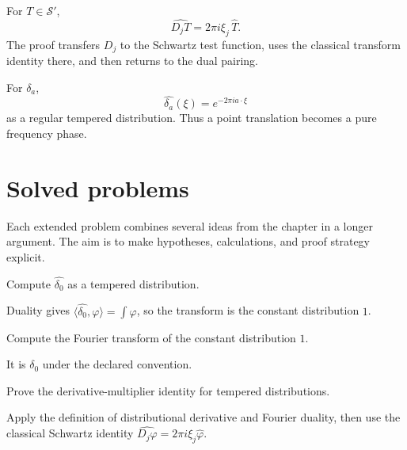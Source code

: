 \begin{example}\label{ex:iii19-worked-03}
For \(T\in\mathcal S'\),
\[
\widehat{D_jT}=2\pi i\xi_j\,\widehat T.
\]
The proof transfers \(D_j\) to the Schwartz test function, uses the classical
transform identity there, and then returns to the dual pairing.
\end{example}

\begin{example}\label{ex:iii19-worked-04}
For \(\delta_a\),
\[
\widehat{\delta_a}(\xi)=e^{-2\pi ia\cdot\xi}
\]
as a regular tempered distribution. Thus a point translation becomes a pure
frequency phase.
\end{example}

\section{Solved problems}
Each extended problem combines several ideas from the chapter in a longer argument. The aim is to make hypotheses, calculations, and proof strategy explicit.

\begin{problem}\label{prob:iii19-problem-01}
Compute \(\widehat{\delta_0}\) as a tempered distribution.
\end{problem}
\begin{solution}
Duality gives
\(\langle\widehat{\delta_0},\varphi\rangle=\int\varphi\), so the transform is
the constant distribution \(1\).
\end{solution}

\begin{problem}\label{prob:iii19-problem-02}
Compute the Fourier transform of the constant distribution \(1\).
\end{problem}
\begin{solution}
It is \(\delta_0\) under the declared convention.
\end{solution}

\begin{problem}\label{prob:iii19-problem-03}
Prove the derivative-multiplier identity for tempered distributions.
\end{problem}
\begin{solution}
Apply the definition of distributional derivative and Fourier duality,
then use the classical Schwartz identity
\(\widehat{D_j\varphi}=2\pi i\xi_j\widehat\varphi\).
\end{solution}

